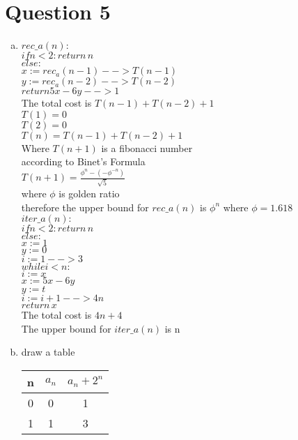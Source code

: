 \documentclass[11pt, a4paper]{article}
\begin{document}
\section*{Question 5}
\begin{enumerate}[(a)]
    \item
    $rec\_a(n):$\\
    $if n<2: return\, n$\\
    $else:$\\
        $x:=rec_a(n-1) --> T(n-1)$\\
        $y:=rec_a(n-2) --> T(n-2)$\\
        $return 5x-6y --> 1$\\
    The total cost is $T(n-1)+T(n-2)+1$\\
    $T(1)=0$\\
    $T(2)=0$\\
    $T(n)=T(n-1)+T(n-2)+1$\\
    Where $T(n+1)$ is a fibonacci number\\
    according to Binet's Formula \cite{Binet}\\
    $T(n+1) = \frac{\phi^n-(-\phi^{-n})}{\sqrt{5}}$\\
    where $\phi$ is golden ratio\\
    therefore the upper bound for $rec\_a(n)$ is $\phi^n$
    where $\phi=1.618$
    \\
    $iter\_a(n):$\\
    $if n<2: return\, n$\\
    $else:$\\
    $x:=1$\\
    $y:=0$\\
    $i:=1 --> 3$\\
    $while i<n:$\\
    $i:=x$\\
    $x:=5x-6y$\\
    $y:=t$\\
    $i:=i+1 --> 4n$\\
    $return\, x$\\
    The total cost is $4n+4$\\
    The upper bound for $iter\_a(n)$ is n
    \item
    draw a table\\
    \begin{tabular}{ | c | c | c | }
        \hline
        n & $a_n$ & $ a_n+2^n $ \\
        \hline
        0 & 0 & 1\\
        \hline
        1 & 1 & 3\\

\end{tabular}
\end{enumerate}
\end{document}
